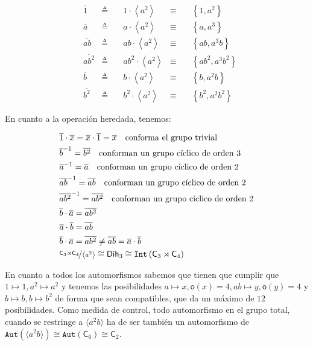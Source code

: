 \documentclass[12pt,a4paper,fleqn,spanish,final,openright]{extbook}
\theoremstyle{definition}
\theoremstyle{remark}
\begin{document}
\begin{align*}
&\overline{1}
&\triangleq&\quad
{1}\cdot{\left\langle{a^2}\right\rangle}
&\equiv&\quad
{\left\lbrace{1,a^2}\right\rbrace}\\
&\overline{a}
&\triangleq&\quad
{a}\cdot{\left\langle{a^2}\right\rangle}
&\equiv&\quad
{\left\lbrace{a,a^3}\right\rbrace}\\
&\overline{ab}
&\triangleq&\quad
{ab}\cdot{\left\langle{a^2}\right\rangle}
&\equiv&\quad
{\left\lbrace{ab,a^3b}\right\rbrace}\\
&\overline{ab^2}
&\triangleq&\quad
{ab^2}\cdot{\left\langle{a^2}\right\rangle}
&\equiv&\quad
{\left\lbrace{ab^2,a^3b^2}\right\rbrace}
\\
&\overline{b}
&\triangleq&\quad 
{b}\cdot{\left\langle{a^2}\right\rangle}
&\equiv&\quad
{\left\lbrace{b,a^2b}\right\rbrace}\\
&\overline{b^2}
&\triangleq&\quad 
{b^2}\cdot{\left\langle{a^2}\right\rangle}
&\equiv&\quad
{\left\lbrace{b^2,a^2b^2}\right\rbrace}
\end{align*}

En cuanto a la operación heredada, tenemos:

\begin{align*}
&\overline{1}\cdot\overline{x}=\overline{x}\cdot\overline{1}=\overline{x}\quad \mbox{conforma el grupo trivial}\\
&{\overline{b}}^{-1}={\overline{b^2}}\quad \mbox{conforman un grupo cíclico de orden 3}\\
&{\overline{a}}^{-1}={\overline{a}}\quad \mbox{conforman un grupo cíclico de orden 2}\\
&{\overline{ab}}^{-1}={\overline{ab}}\quad \mbox{conforman un grupo cíclico de orden 2}\\
&{\overline{ab^2}}^{-1}={\overline{ab^2}}\quad \mbox{conforman un grupo cíclico de orden 2}\\
&{\overline{b}}\cdot{\overline{a}}=\overline{ab^2}\\
&{\overline{a}}\cdot{\overline{b}}=\overline{ab}\\
&{\overline{b}}\cdot{\overline{a}}=\overline{ab^2}\neq\overline{ab}={\overline{a}}\cdot{\overline{b}}\\
&\nicefrac{{{\mathsf{C}}_{3}}\rtimes{{\mathsf{C}}_{4}}}{\left\langle a^2 \right\rangle} \cong{{\mathsf{Dih}}_{3}}\cong {\mathtt{Int}\left({{{\mathsf{C}}_{3}}\rtimes{{\mathsf{C}}_{4}}}\right)}
\end{align*}
 
En cuanto a todos los automorfismos sabemos que tienen que cumplir que $1 \mapsto 1 , a^2 \mapsto a^2$ y tenemos las posibilidades $a \mapsto x , \mathsf{o}(x)=4, ab \mapsto y, \mathsf{o}(y)=4$ y $b\mapsto b,b\mapsto b^2$ de forma que sean compatibles, que da un máximo de $12$ posibilidades. Como medida de control, todo automorfismo en el grupo total, cuando se restringe a $\langle a^2 b\rangle$ ha de ser también un automorfismo de $\mathtt{Aut}\left(\langle a^2 b\rangle\right)\cong\mathtt{Aut}\left({{\mathsf{C}}_{6}}\right)\cong {{\mathsf{C}}_{2}}$.
\end{document}
